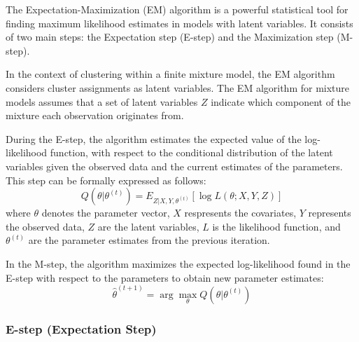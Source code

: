 \documentclass{article}
\begin{document}

The Expectation-Maximization (EM) algorithm is a powerful statistical tool for finding maximum likelihood estimates in models with latent variables. It consists of two main steps: the Expectation step (E-step) and the Maximization step (M-step).

In the context of clustering within a finite mixture model, the EM algorithm considers cluster assignments as latent variables. 
The EM algorithm for mixture models assumes that a set of latent variables $Z$ indicate which component of the mixture each observation originates from.

During the E-step, the algorithm estimates the expected value of the log-likelihood function, with respect to the conditional distribution of the latent variables given the observed data and the current estimates of the parameters. This step can be formally expressed as follows:
\begin{equation}
Q(\theta | \theta^{(t)}) = E_{Z|X, Y, \theta^{(t)}}[\log L(\theta; X, Y, Z)]
\end{equation}
where \( \theta \) denotes the parameter vector, \(X \) respresents the covariates, \( Y \) represents the observed data, \( Z \) are the latent variables, \( L \) is the likelihood function, and \( \theta^{(t)} \) are the parameter estimates from the previous iteration.

In the M-step, the algorithm maximizes the expected log-likelihood found in the E-step with respect to the parameters to obtain new parameter estimates:
\begin{equation}
\hat{\theta}^{(t+1)} = \arg \max_{\theta} Q(\theta | \theta^{(t)})
\end{equation}

\subsubsection{E-step (Expectation Step)}
\end{document}
